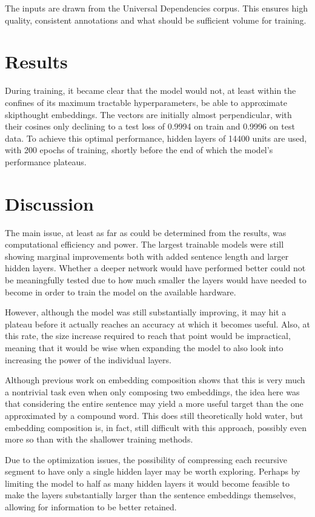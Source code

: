 \documentclass[11pt]{article}
\begin{document}
The inputs are drawn from the Universal Dependencies corpus. This ensures high quality, consistent annotations and what should be sufficient volume for training.

\section{Results}

During training, it became clear that the model would not, at least within the confines of its maximum tractable hyperparameters, be able to approximate skipthought embeddings. The vectors are initially almost perpendicular, with their cosines only declining to a test loss of 0.9994 on train and 0.9996 on test data. To achieve this optimal performance, hidden layers of 14400 units are used, with 200 epochs of training, shortly before the end of which the model's performance plateaus.

\section{Discussion}

The main issue, at least as far as could be determined from the results, was computational efficiency and power. The largest trainable models were still showing marginal improvements both with added sentence length and larger hidden layers. Whether a deeper network would have performed better could not be meaningfully tested due to how much smaller the layers would have needed to become in order to train the model on the available hardware.

However, although the model was still substantially improving, it may hit a plateau before it actually reaches an accuracy at which it becomes useful. Also, at this rate, the size increase required to reach that point would be impractical, meaning that it would be wise when expanding the model to also look into increasing the power of the individual layers.

Although previous work on embedding composition shows that this is very much a nontrivial task even when only composing two embeddings, the idea here was that considering the entire sentence may yield a more useful target than the one approximated by a compound word. This does still theoretically hold water, but embedding composition is, in fact, still difficult with this approach, possibly even more so than with the shallower training methods.

Due to the optimization issues, the possibility of compressing each recursive segment to have only a single hidden layer may be worth exploring. Perhaps by limiting the model to half as many hidden layers it would become feasible to make the layers substantially larger than the sentence embeddings themselves, allowing for information to be better retained.
\end{document}
